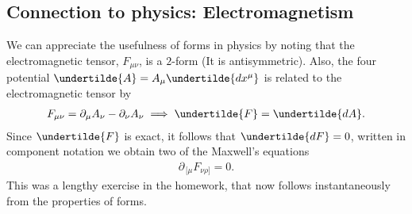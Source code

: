\documentclass[10pt]{article}
\begin{document}
	\subsection{Connection to physics: Electromagnetism}
	We can appreciate the usefulness of forms in physics by noting that the electromagnetic tensor, $F_{\mu\nu}$, is a $2$-form (It is antisymmetric). Also, the four potential $\undertilde{A}=A_{\mu}\undertilde{d x^{\mu}}$ is related to the electromagnetic tensor by
	\begin{align}
	F_{\mu\nu}=\partial_{\mu}A_{\nu}-\partial_{\nu}A_{\nu} \implies \undertilde{F}=\undertilde{d A}.
	\end{align}
	Since $\undertilde{F}$ is exact, it follows that $\undertilde{d F}=0$, written in component notation we obtain two of the Maxwell's equations
	\begin{align}
	\label{Maxwell}
	\partial_{\,[\mu}F_{\nu\rho]}=0.
	\end{align} 
	This was a lengthy exercise in the homework, that now follows instantaneously from the properties of forms.  
\end{document}
